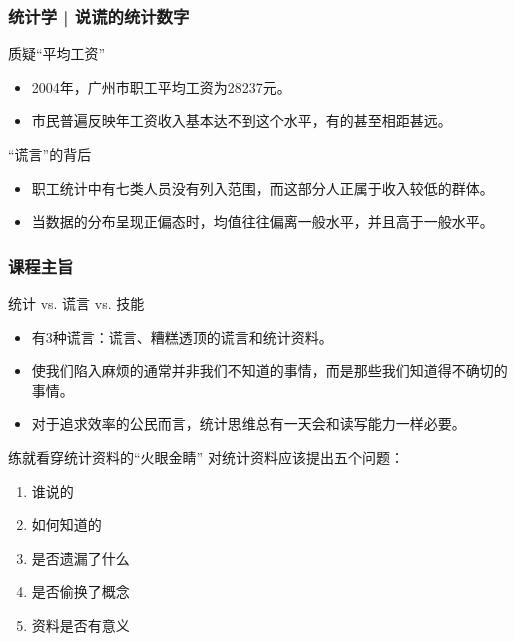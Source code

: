 \begin{frame}
  \frametitle{统计学 | 说谎的统计数字}
  \begin{block}{质疑“平均工资”}
    \begin{itemize}
      \item 2004年，广州市职工平均工资为28237元。
      \item 市民普遍反映年工资收入基本达不到这个水平，有的甚至相距甚远。
    \end{itemize}
  \end{block}
  \pause
  \begin{block}{“谎言”的背后}
    \begin{itemize}
      \item 职工统计中有七类人员没有列入范围，而这部分人正属于收入较低的群体。
      \item 当数据的分布呈现正偏态时，均值往往偏离一般水平，并且高于一般水平。
    \end{itemize}
  \end{block}
\end{frame}

\begin{frame}[fragile]
  \frametitle{课程主旨}
  \begin{block}{统计 vs. 谎言 vs. 技能}
    \begin{itemize}
      \item 有3种谎言：谎言、糟糕透顶的谎言和统计资料。
      \item 使我们陷入麻烦的通常并非我们不知道的事情，而是那些我们知道得不确切的事情。
      \item 对于追求效率的公民而言，统计思维总有一天会和读写能力一样必要。
    \end{itemize}
  \end{block}
  \pause
  \vspace{-0.5em}
  \begin{block}{练就看穿统计资料的“火眼金睛”}
    对统计资料应该提出五个问题：
    \begin{enumerate}
      \item 谁说的
      \item 如何知道的
      \item 是否遗漏了什么
      \item 是否偷换了概念
      \item 资料是否有意义
    \end{enumerate}
  \end{block}
\end{frame}


